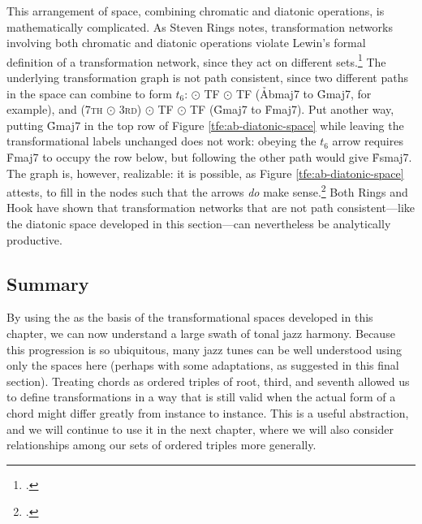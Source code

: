This arrangement of \tf space, combining chromatic and diatonic operations, is
mathematically complicated. As Steven Rings notes, transformation networks
involving both chromatic and diatonic operations violate Lewin's formal
definition of a transformation network, since they act on different
sets.\footcite[98--99]{rings:2011} The underlying transformation graph is not
path consistent, since two different paths in the space can combine to form
$t_6$: \slideS $\odot$ TF $\odot$ TF (\h{Abmaj7} to \h{Gmaj7}, for example), and
(\textsc{7th} $\odot$ \textsc{3rd}) $\odot$ TF $\odot$ TF (\h{Gmaj7} to
\h{Fmaj7}). Put another way, putting \h{Gmaj7} in the top row of Figure
\ref{tfe:ab-diatonic-space} while leaving the transformational labels
unchanged does not work: obeying the $t_6$ arrow requires
\h{Fmaj7} to occupy the row below, but following the other path would give
\h{Fsmaj7}. The graph is, however, realizable: it is possible, as Figure
\ref{tfe:ab-diatonic-space} attests, to fill in the nodes such that the arrows
\emph{do} make sense.\footcite[29]{hook:2007} Both Rings and Hook have shown
that transformation networks that are not path consistent---like the diatonic
\tf space developed in this section---can nevertheless be analytically
productive.

\subsection{Summary}

By using the \tfo as the basis of the transformational spaces developed in
this chapter, we can now understand a large swath of tonal jazz harmony.
Because this progression is so ubiquitous, many jazz tunes can be well
understood using only the spaces here (perhaps with some adaptations, as
suggested in this final section). Treating chords as ordered triples of root,
third, and seventh allowed us to define transformations in a way that is still
valid when the actual form of a chord might differ greatly from instance to
instance. This is a useful abstraction, and we will continue to use it in the
next chapter, where we will also consider relationships among our sets of
ordered triples more generally.


